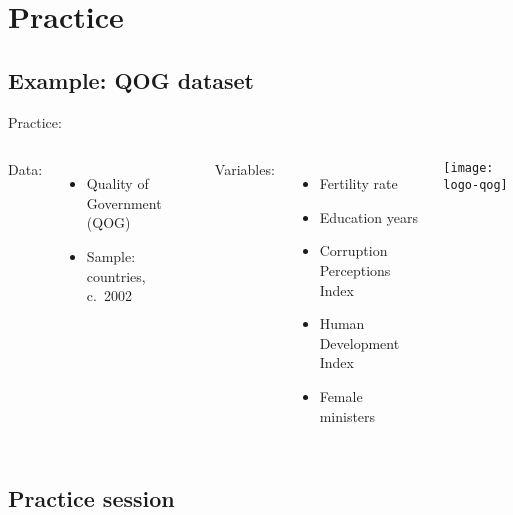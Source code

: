 \documentclass[t]{beamer}
\begin{document}
	\section{Practice}

	\subsection{Example: QOG dataset}
	
	\begin{frame}[t]{Practice: }

		\begin{columns}[c]

	    Data:\\[.5em]

			\begin{itemize}
				\item Quality of Government (QOG)
				\item Sample: countries, c.~2002
			\end{itemize}
		
			\vspace{.75em}
		
	    Variables:\\[.5em]
		
			\begin{itemize}
				\item Fertility rate
				\item Education years
				\item Corruption Perceptions Index
				\item Human Development Index
				\item Female ministers
			\end{itemize}
	

			\texttt{[image: logo-qog]}

		\end{columns}
	
	\end{frame}
	
	\subsection{Practice session}
  
\end{document}
